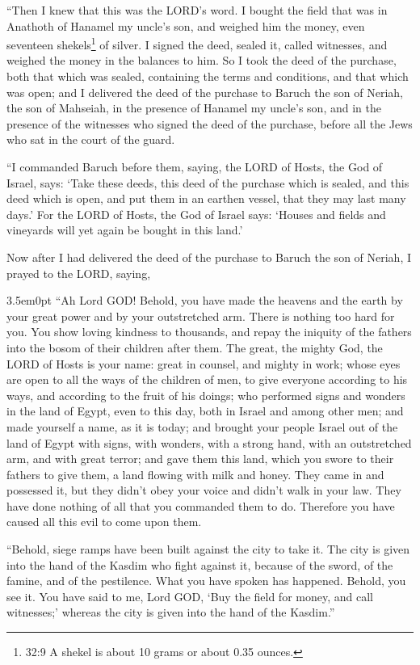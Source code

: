 “Then I knew that this was the LORD’s word. \myverse{}I bought the field that was in Anathoth of Hanamel my uncle’s son, and weighed him the money, even seventeen shekels\footnote{32:9 A shekel is about 10 grams or about 0.35 ounces.} of silver. \myverse{}I signed the deed, sealed it, called witnesses, and weighed the money in the balances to him. \myverse{}So I took the deed of the purchase, both that which was sealed, containing the terms and conditions, and that which was open; \myverse{}and I delivered the deed of the purchase to Baruch the son of Neriah, the son of Mahseiah, in the presence of Hanamel my uncle’s son, and in the presence of the witnesses who signed the deed of the purchase, before all the Jews who sat in the court of the guard.


\myverse{}“I commanded Baruch before them, saying, \myverse{}the LORD of Hosts, the God of Israel, says: ‘Take these deeds, this deed of the purchase which is sealed, and this deed which is open, and put them in an earthen vessel, that they may last many days.’ \myverse{}For the LORD of Hosts, the God of Israel says: ‘Houses and fields and vineyards will yet again be bought in this land.’


\myverse{}Now after I had delivered the deed of the purchase to Baruch
the son of Neriah, I prayed to the LORD, saying,



\begin{adjustwidth}{3.5em}{0pt}
 \myverse{}“Ah Lord GOD! Behold, you have made the heavens and the earth by your great power and by your outstretched arm. There is nothing too hard for you. \myverse{}You show loving kindness to thousands, and repay the iniquity of the fathers into the bosom of their children after them. The great, the mighty God, the LORD of Hosts is your name: \myverse{}great in counsel, and mighty in work; whose eyes are open to all the ways of the children of men, to give everyone according to his ways, and according to the fruit of his doings; \myverse{}who performed signs and wonders in the land of Egypt, even to this day, both in Israel and among other men; and made yourself a name, as it is today; \myverse{}and brought your people Israel out of the land of Egypt with signs, with wonders, with a strong hand, with an outstretched arm, and with great terror; \myverse{}and gave them this land, which you swore to their fathers to give them, a land flowing with milk and honey. \myverse{}They came in and possessed it, but they didn’t obey your voice and didn’t walk in your law. They have done nothing of all that you commanded them to do. Therefore you have caused all this evil to come upon them.


 \myverse{}“Behold, siege ramps have been built against the city to take it. The city is given into the hand of the Kasdim who fight against it, because of the sword, of the famine, and of the pestilence. What you have spoken has happened. Behold, you see it. \myverse{}You have said to me, Lord GOD, ‘Buy the field for money, and call witnesses;’ whereas the city is given into the hand of the Kasdim.”
\end{adjustwidth}

